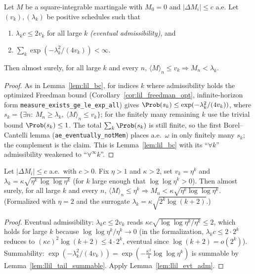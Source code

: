 \begin{lemma}\label{lem:llil_evt_adm}
\leanok
{}
Let $M$ be a square-integrable martingale with $M_0=0$ and $|\Delta M_i|\le c$ a.e.
Let $(v_k),(\lambda_k)$ be positive schedules such that
\begin{enumerate}
  \item $\lambda_k c\le 2v_k$ for all large $k$ \emph{(eventual admissibility)}, and
  \item $\sum_k\exp(-\lambda_k^2/(4v_k))<\infty$.
\end{enumerate}
Then almost surely, for all large $k$ and every $n$,
$\langle M\rangle_n\le v_k\Rightarrow M_n<\lambda_k$.
\end{lemma}
\begin{proof}\leanok
As in Lemma~\ref{lem:lil_bc}, for indices $k$ where admissibility holds the optimized
Freedman bound (Corollary~\ref{cor:lil_freedman_opt}, infinite-horizon form
\texttt{measure\_exists\_ge\_le\_exp\_all}) gives
$\Prob(s_k)\le\exp(-\lambda_k^2/(4v_k))$, where
$s_k=\{\exists n:\ M_n\ge\lambda_k,\ \langle M\rangle_n\le v_k\}$; for the finitely many
remaining $k$ use the trivial bound $\Prob(s_k)\le1$. The total $\sum_k\Prob(s_k)$ is
still finite, so the first Borel--Cantelli lemma (\texttt{ae\_eventually\_notMem})
places a.e.\ $\omega$ in only finitely many $s_k$; the complement is the claim. This is
Lemma~\ref{lem:lil_bc} with its ``$\forall k$'' admissibility weakened to
``$\forall^\infty k$''.
\end{proof}

\begin{lemma}\label{lem:llil_bounded_block}
\leanok
{}
Let $|\Delta M_i|\le c$ a.e.\ with $c>0$. Fix $\eta>1$ and $\kappa>2$, set $v_k=\eta^k$
and $\lambda_k=\kappa\sqrt{\eta^k\,\log\log\eta^k}$ (for $k$ large enough that
$\log\log\eta^k>0$). Then almost surely, for all large $k$ and every $n$,
$\langle M\rangle_n\le\eta^k\Rightarrow M_n<\kappa\sqrt{\eta^k\log\log\eta^k}$.
(Formalized with $\eta=2$ and the surrogate $\lambda_k=\kappa\sqrt{2^k\log(k+2)}$.)
\end{lemma}
\begin{proof}\leanok
Eventual admissibility: $\lambda_k c\le 2v_k$ reads
$\kappa c\sqrt{\log\log\eta^k/\eta^k}\le2$, which holds for large $k$ because
$\log\log\eta^k/\eta^k\to0$ (in the formalization, $\lambda_k c\le2\cdot2^k$ reduces to
$(\kappa c)^2\log(k+2)\le4\cdot2^k$, eventual since $\log(k+2)=o(2^k)$). Summability:
$\exp(-\lambda_k^2/(4v_k))=\exp(-\tfrac{\kappa^2}{4}\log\log\eta^k)$ is summable by
Lemma~\ref{lem:llil_tail_summable}. Apply Lemma~\ref{lem:llil_evt_adm}.
\end{proof}

